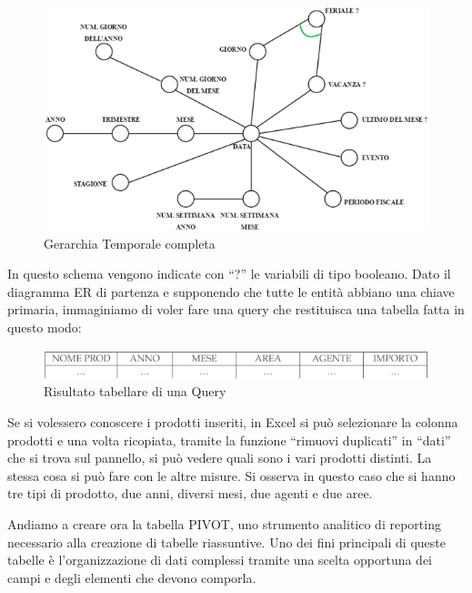 \begin{center}
\begin{figure}[H]
\centering
\includegraphics[scale=0.8]{figures/time_hierarchy.png}
\caption{Gerarchia Temporale completa}
\end{figure}
\end{center}

In questo schema vengono indicate con “?” le variabili di tipo booleano. Dato il diagramma ER di partenza e supponendo che tutte le entità abbiano una chiave primaria, immaginiamo di voler fare una query che restituisca una tabella fatta in questo modo:

\begin{center}
\begin{figure}[H]
\centering
\includegraphics[scale=0.8]{figures/query_res.png}
\caption{Risultato tabellare di una Query}
\end{figure}
\end{center}

Se si volessero conoscere i prodotti inseriti, in Excel si può selezionare la colonna prodotti e una volta ricopiata, tramite la funzione “rimuovi duplicati” in “dati” che si trova sul pannello, si può vedere quali sono i vari prodotti distinti. La stessa cosa si può fare con le altre misure. Si osserva in questo caso che si hanno tre tipi di prodotto, due anni, diversi mesi, due agenti e due aree.  

Andiamo a creare ora la tabella PIVOT, uno strumento analitico di reporting necessario alla creazione di tabelle riassuntive. Uno dei fini principali di queste tabelle è l'organizzazione di dati complessi tramite una scelta opportuna dei campi e degli elementi che devono comporla. 
    
